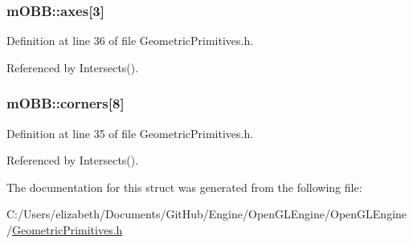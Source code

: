 \subsubsection[{\texorpdfstring{axes}{axes}}]{ m\+O\+B\+B\+::axes\mbox{[}3\mbox{]}}\hypertarget{structm_o_b_b_a8ea25dd633bf010b91bbb4556d8eb92a}{}\label{structm_o_b_b_a8ea25dd633bf010b91bbb4556d8eb92a}


Definition at line 36 of file Geometric\+Primitives.\+h.



Referenced by Intersects().

\subsubsection[{\texorpdfstring{corners}{corners}}]{ m\+O\+B\+B\+::corners\mbox{[}8\mbox{]}}\hypertarget{structm_o_b_b_a01fffe0657134010f2937f0f505f293c}{}\label{structm_o_b_b_a01fffe0657134010f2937f0f505f293c}


Definition at line 35 of file Geometric\+Primitives.\+h.



Referenced by Intersects().



The documentation for this struct was generated from the following file\+:\begin{DoxyCompactItemize}
\item 
C\+:/\+Users/elizabeth/\+Documents/\+Git\+Hub/\+Engine/\+Open\+G\+L\+Engine/\+Open\+G\+L\+Engine/\hyperlink{_geometric_primitives_8h}{Geometric\+Primitives.\+h}\end{DoxyCompactItemize}
